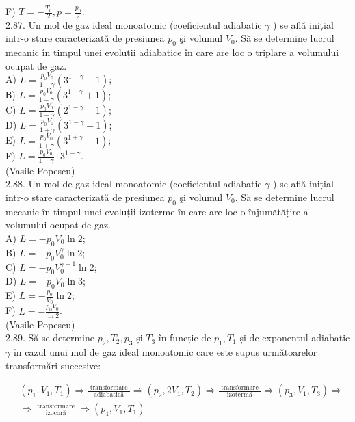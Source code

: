 \documentclass[10pt]{article}
\begin{document}
F) $T=-\frac{T_{0}}{2}, p=\frac{p_{0}}{2}$.\\
2.87. Un mol de gaz ideal monoatomic (coeficientul adiabatic $\gamma$ ) se află inițial intr-o stare caracterizată de presiunea $p_{0}$ şi volumul $V_{0}$. Să se determine lucrul mecanic în timpul unei evoluții adiabatice în care are loc o triplare a volumului ocupat de gaz.\\
A) $L=\frac{p_{0} V_{0}}{1-\gamma}\left(3^{1-\gamma}-1\right)$;\\
В) $L=\frac{p_{0} V_{0}}{1-\gamma}\left(3^{1-\gamma}+1\right)$;\\
C) $L=\frac{p_{0} V_{0}}{1-\gamma}\left(2^{1-\gamma}-1\right)$;\\
D) $L=\frac{p_{0} V_{0}}{1+\gamma}\left(3^{1-\gamma}-1\right)$;\\
E) $L=\frac{p_{0} V_{0}}{1+\gamma}\left(3^{1+\gamma}-1\right)$;\\
F) $L=\frac{p_{0} V_{0}}{1-\gamma} \cdot 3^{1-\gamma}$.\\
(Vasile Popescu)\\
2.88. Un mol de gaz ideal monoatomic (coeficientul adiabatic $\gamma$ ) se află inițial intr-o stare caracterizată de presiunea $p_{0}$ şi volumul $V_{0}$. Să se determine lucrul mecanic în timpul unei evoluții izoterme în care are loc o înjumătățire a volumului ocupat de gaz.\\
A) $L=-p_{0} V_{0} \ln 2$;\\
B) $L=-p_{0} V_{0}^{\gamma} \ln 2$;\\
C) $L=-p_{0} V_{0}^{\gamma-1} \ln 2$;\\
D) $L=-p_{0} V_{0} \ln 3$;\\
E) $L=-\frac{p_{0}}{V_{0}} \ln 2$;\\
F) $L=-\frac{p_{0} V_{0}}{\ln 2}$.\\
(Vasile Popescu)\\
2.89. Să se determine $p_{2}, T_{2}, p_{3}$ și $T_{3}$ în funcție de $p_{1}, T_{1}$ și de exponentul adiabatic $\gamma$ în cazul unui mol de gaz ideal monoatomic care este supus următoarelor transformări succesive:

$$
\begin{aligned}
& \left(p_{1}, V_{1}, T_{1}\right) \Rightarrow \frac{\text { transformare }}{\text { adiabatică }} \Rightarrow\left(p_{2}, 2 V_{1}, T_{2}\right) \Rightarrow \frac{\text { transformare }}{\text { izotermă }} \Rightarrow\left(p_{3}, V_{1}, T_{3}\right) \Rightarrow \\
& \Rightarrow \frac{\text { transformare }}{\text { izocoră }} \Rightarrow\left(p_{1}, V_{1}, T_{1}\right)
\end{aligned}
$$
\end{document}
